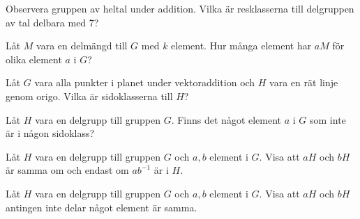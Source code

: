 \documentclass[11pt,fleqn]{book} %
\begin{document}
\begin{problem}
  Observera gruppen av heltal under addition. Vilka är resklasserna till delgruppen av tal delbara med 7?
\end{problem}

\begin{problem}
  Låt \(M\) vara en delmängd till \(G\) med \(k\) element. Hur många element har \(aM\) för olika element \(a\) i \(G\)?
\end{problem}

\begin{problem}
  Låt \(G\) vara alla punkter i planet under vektoraddition och \(H\) vara en rät linje genom origo. Vilka är sidoklasserna till \(H\)?
\end{problem}

\begin{problem}
  Låt \(H\) vara en delgrupp till gruppen \(G\). Finns det något element \(a\) i \(G\) som inte är i någon sidoklass?
\end{problem}

\begin{problem}
  Låt \(H\) vara en delgrupp till gruppen \(G\) och \(a, b\) element i \(G\). Visa att \(aH\) och \(bH\) är samma om och endast om \(ab^{-1}\) är i \(H\).
\end{problem}

\begin{problem}
  Låt \(H\) vara en delgrupp till gruppen \(G\) och \(a, b\) element i \(G\). Visa att \(aH\) och \(bH\) antingen inte delar något element är samma.
\end{problem}
\end{document}
